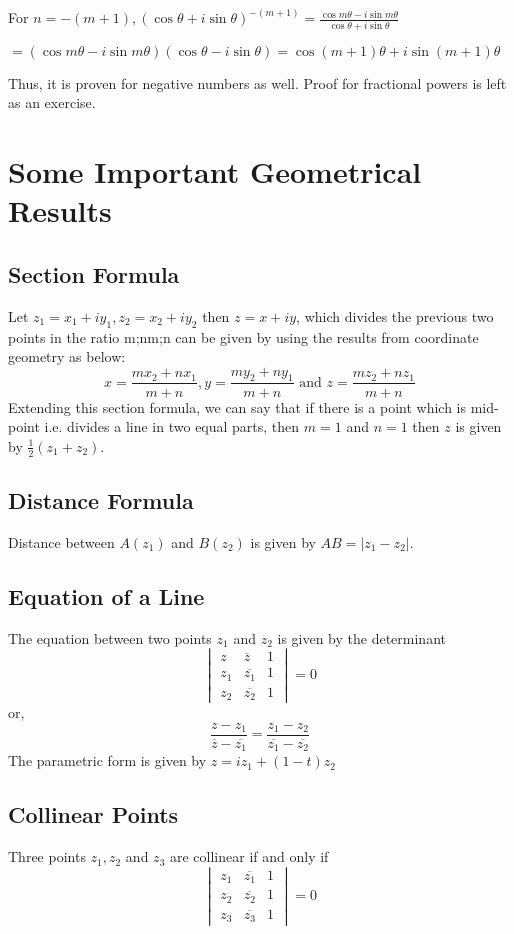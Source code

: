 \noindent For $n = -(m + 1), (\cos\theta + i\sin\theta)^{-(m + 1)} = \frac{\cos m\theta - i\sin m\theta}{\cos\theta + i\sin\theta}$

\noindent $= (\cos m\theta - i\sin m\theta)(\cos\theta - i\sin\theta) = \cos(m + 1)\theta + i\sin(m + 1)\theta$

Thus, it is proven for negative numbers as well. Proof for fractional powers is left as an exercise.

\section{Some Important Geometrical Results}
\subsection{Section Formula}
Let $z_1 = x_1 + iy_1, z_2 = x_2 + iy_2$ then $z = x + iy$, which divides the previous two points in the ratio m;nm;n can be given
by using the results from coordinate geometry as below:
$$x = \frac{mx_2 + nx_1}{m + n}, y = \frac{my_2 + ny_1}{m + n} \text{~and~}z = \frac{mz_2 + nz_1}{m + n}$$
Extending this section formula, we can say that if there is a point which is mid-point i.e. divides a line in two equal parts, then
$m = 1$ and $n = 1$ then $z$ is given by $\frac{1}{2}(z_1 + z_2)$.
\subsection{Distance Formula}
Distance between $A(z_1)$ and $B(z_2)$ is given by $AB = |z_1 - z_2|$.
\subsection{Equation of a Line}
The equation between two points $z_1$ and $z_2$ is given by the determinant
$$\begin{vmatrix}z&\overline{z}&1\\z_1&\overline{z_1}&1\\z_2&\overline{z_2}&1\end{vmatrix} = 0$$
or,
$$\frac{z - z_1}{\overline{z} - \overline{z_1}} = \frac{z_1 - z_2}{\overline{z_1} - \overline{z_2}}$$
The parametric form is given by $z = iz_1 + (1 - t)z_2$
\subsection{Collinear Points}
Three points $z_1, z_2$ and $z_3$ are collinear if and only if
$$\begin{vmatrix}z_1&\overline{z_1}&1\\z_2&\overline{z_2}&1\\z_3&\overline{z_3}&1\end{vmatrix} = 0$$
